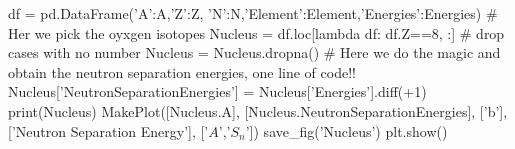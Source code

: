 \documentclass[%
oneside,                 %
final,                   %
10pt]{article}
\newenvironment{doconceexercise}{}{}
\begin{document}
\begin{doconceexercise}
df = pd.DataFrame({'A':A,'Z':Z, 'N':N,'Element':Element,'Energies':Energies})
# Her we pick the oyxgen isotopes
Nucleus = df.loc[lambda df: df.Z==8, :]
# drop cases with no number
Nucleus = Nucleus.dropna()
# Here we do the magic and obtain the neutron separation energies, one line of code!!
Nucleus['NeutronSeparationEnergies'] = Nucleus['Energies'].diff(+1)
print(Nucleus)
MakePlot([Nucleus.A], [Nucleus.NeutronSeparationEnergies], ['b'], ['Neutron Separation Energy'], ['$A$','$S_n$'])
save_fig('Nucleus')
plt.show()

\epycod


\end{doconceexercise}



\end{document}
